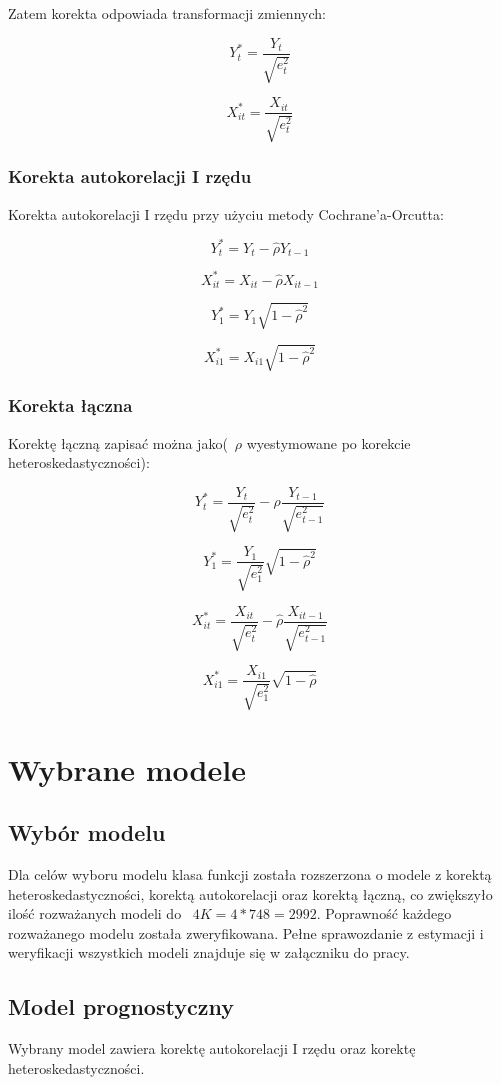 \documentclass{article}
\begin{document}
Zatem korekta odpowiada transformacji zmiennych:

\[Y_t^* = \frac{Y_t}{\sqrt{e_t^2}}\]

\[X_{it}^* = \frac{X_{it}}{\sqrt{e_t^2}}\]

\newpage
\subsubsection{Korekta autokorelacji I rzędu}
Korekta autokorelacji I rzędu przy użyciu metody Cochrane'a-Orcutta:

\[Y_t^* = Y_t - \hat{\rho}Y_{t-1}\]

\[X_{it}^* = X_{it} - \hat{\rho}X_{it-1}\]

\[Y_1^* = Y_1\sqrt{1-\hat{\rho}^2}\]

\[X_{i1}^* = X_{i1}\sqrt{1 - \hat{\rho}^2}\]

\subsubsection{Korekta łączna}
Korektę łączną zapisać można jako(~$\rho$ wyestymowane po korekcie heteroskedastyczności):

\[Y_t^* = \frac{Y_t}{\sqrt{e_t^2}} - \hat{\rho}\frac{Y_{t-1}}{\sqrt{e_{t-1}^2}}\]

\[Y_1^* = \frac{Y_1}{\sqrt{e_1^2}}\sqrt{1-\hat{\rho}^2}\]

\[X_{it}^* = \frac{X_{it}}{\sqrt{e_t^2}} - \hat{\rho}\frac{X_{it-1}}{\sqrt{e_{t-1}^2}}\]

\[X_{i1}^* = \frac{X_{i1}}{\sqrt{e_1^2}}\sqrt{1-\hat{\rho}}\]

\newpage
\section{Wybrane modele}
\subsection{Wybór modelu}
Dla celów wyboru modelu klasa funkcji została rozszerzona o modele z korektą heteroskedastyczności, korektą autokorelacji oraz korektą łączną, co zwiększyło ilość rozważanych modeli do ~$4K=4*748=2992$. Poprawność każdego rozważanego modelu została zweryfikowana. Pełne sprawozdanie z estymacji i weryfikacji wszystkich modeli znajduje się w załączniku do pracy.

\subsection{Model prognostyczny}
Wybrany model zawiera korektę autokorelacji I rzędu oraz korektę heteroskedastyczności.
\end{document}
